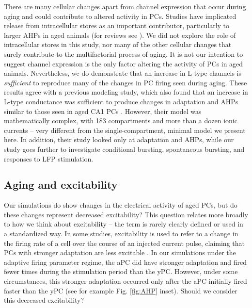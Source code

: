 \documentclass[12pt]{article}
\begin{document}
There are many cellular changes apart from {\Ca} channel expression that occur during aging and could contribute to altered activity in PCs. Studies have implicated {\Ca} release from intracellular stores as an important contributor, particularly to larger AHPs in aged animals
(for reviews see \citep{thibault2007expansion,toescu2010calcium}). We did not explore the role of intracellular {\Ca} stores in this study, nor many of the other cellular changes that surely contribute to the multifactorial process of aging. It is not our intention to suggest {\Ca} channel expression is the only factor altering the activity of PCs in aged animals. Nevertheless, we do demonstrate that an increase in L-type {\Ca} channels is \textit{sufficient} to reproduce many of the changes in PC firing seen during aging. These results agree with a previous modeling study, which also found that an increase in L-type {\Ca} conductance was sufficient to produce changes in adaptation and AHPs similar to those seen in aged CA1 PCs \cite{markaki2005modelling}. However, their model was mathematically complex, with 183 compartments and more than a dozen ionic currents -- very different from the single-compartment, minimal model we present here. In addition, their study looked only at adaptation and AHPs, while our study goes further to investigate conditional bursting, spontaneous bursting, and responses to LFP stimulation.

\subsection{Aging and excitability}
 Our simulations do show changes in the electrical activity of aged PCs, but do these changes represent decreased excitability? This question relates more broadly to how we think about excitability -- the term is rarely clearly defined or used in a standardized way. In some studies, excitability is used to refer to a change in the firing rate of a cell over the course of an injected current pulse, claiming that PCs with stronger adaptation are less excitable \citep{moyer1992nimodipine}. In our simulations under the adaptive firing parameter regime, the aPC did have stronger adaptation and fired fewer times during the stimulation period than the yPC. However, under some circumstances, this stronger adaptation occurred only after the aPC initially fired faster than the yPC (see for example Fig. \ref{fig:AHP} inset). Should we consider this decreased excitability? 
 
\end{document}

